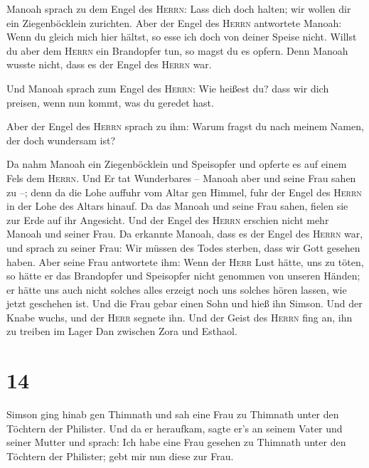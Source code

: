  Manoah sprach zu dem Engel des \textsc{Herrn}: Lass dich
doch halten; wir wollen dir ein Ziegenböcklein zurichten.
 Aber der Engel des \textsc{Herrn} antwortete Manoah:
Wenn du gleich mich hier hältst, so esse ich doch von deiner Speise
nicht. Willst du aber dem \textsc{Herrn} ein Brandopfer tun, so magst du
es opfern. Denn Manoah wusste nicht, dass es der Engel des
\textsc{Herrn} war.

 Und Manoah sprach zum Engel des \textsc{Herrn}: Wie
heißest du? dass wir dich preisen, wenn nun kommt, was du geredet hast.

 Aber der Engel des \textsc{Herrn} sprach zu ihm: Warum
fragst du nach meinem Namen, der doch wundersam ist?

 Da nahm Manoah ein Ziegenböcklein und Speisopfer und
opferte es auf einem Fels dem \textsc{Herrn}. Und Er tat Wunderbares --
Manoah aber und seine Frau sahen zu --;  denn da die Lohe
auffuhr vom Altar gen Himmel, fuhr der Engel des \textsc{Herrn} in der
Lohe des Altars hinauf. Da das Manoah und seine Frau sahen, fielen sie
zur Erde auf ihr Angesicht.  Und der Engel des
\textsc{Herrn} erschien nicht mehr Manoah und seiner Frau. Da erkannte
Manoah, dass es der Engel des \textsc{Herrn} war,  und
sprach zu seiner Frau: Wir müssen des Todes sterben, dass wir Gott
gesehen haben.  Aber seine Frau antwortete ihm: Wenn der
\textsc{Herr} Lust hätte, uns zu töten, so hätte er das Brandopfer und
Speisopfer nicht genommen von unseren Händen; er hätte uns auch nicht
solches alles erzeigt noch uns solches hören lassen, wie jetzt geschehen
ist.  Und die Frau gebar einen Sohn und hieß ihn Simson.
Und der Knabe wuchs, und der \textsc{Herr} segnete ihn. 
Und der Geist des \textsc{Herrn} fing an, ihn zu treiben im Lager Dan
zwischen Zora und Esthaol.

\hypertarget{section-13}{%
\section{14}\label{section-13}}

 Simson ging hinab gen Thimnath und sah eine Frau zu
Thimnath unter den Töchtern der Philister.  Und da er
heraufkam, sagte er's an seinem Vater und seiner Mutter und sprach: Ich
habe eine Frau gesehen zu Thimnath unter den Töchtern der Philister;
gebt mir nun diese zur Frau.


